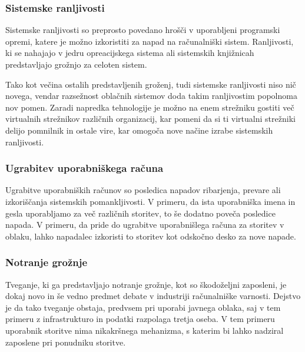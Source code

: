 \documentclass[12pt,a4paper,openany]{book}
\begin{document}
\subsubsection{Sistemske ranljivosti}
Sistemske ranljivosti so preprosto povedano hrošči v uporabljeni programski opremi, katere je možno izkoristiti za napad na računalniški sistem. Ranljivosti, ki se nahajajo v jedru opreacijskega sistema ali sistemskih knjižnicah predstavljajo grožnjo za celoten sistem.

Tako kot večina ostalih predstavljenih groženj, tudi sistemske ranljivosti niso nič novega, vendar razsežnost oblačnih sistemov doda takim ranljivostim popolnoma nov pomen. Zaradi napredka tehnologije je možno na enem strežniku gostiti več virtualnih strežnikov različnih organizacij, kar pomeni da si ti virtualni strežniki delijo pomnilnik in ostale vire, kar omogoča nove načine izrabe sistemskih ranljivosti.

\subsubsection{Ugrabitev uporabniškega računa}
Ugrabitve uporabniških računov so posledica napadov ribarjenja, prevare ali izkoriščanja sistemskih pomankljivosti. V primeru, da ista uporabniška imena in gesla uporabljamo za več različnih storitev, to še dodatno poveča posledice napada. V primeru, da pride do ugrabitve uporabnišlega računa za storitev v oblaku, lahko napadalec izkoristi to storitev kot odskočno desko za nove napade.

\subsubsection{Notranje grožnje}
Tveganje, ki ga predstavljajo notranje grožnje, kot so škodoželjni zaposleni, je dokaj novo in še vedno predmet debate v industriji računalniške varnosti. Dejstvo je da tako tveganje obstaja, predvsem pri uporabi javnega oblaka, saj v tem primeru z infrastrukturo in podatki razpolaga tretja oseba. V tem primeru uporabnik storitve nima nikakršnega mehanizma, s katerim bi lahko nadziral zaposlene pri ponudniku storitve.
\end{document}
